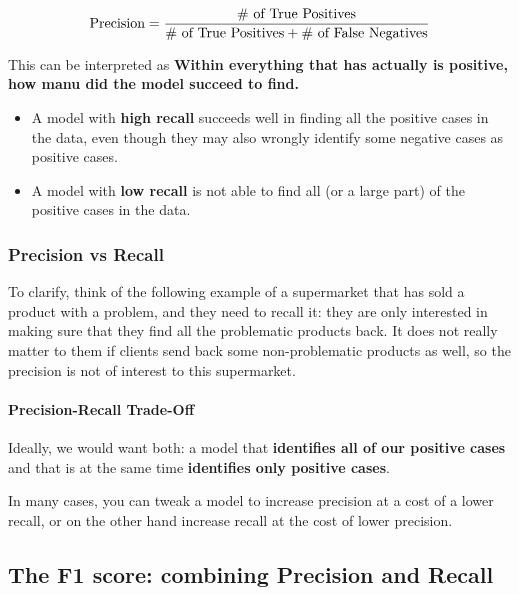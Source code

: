 \begin{align*}
\textnormal{Precision} = \frac{\# \textnormal{ of  True Positives}}{\# \textnormal{ of True Positives} + \# \textnormal{ of False Negatives}}
\end{align*}

This can be interpreted as \textbf{Within everything that has actually
is positive, how manu did the model succeed to find.}

\begin{itemize}
\item
  A model with \textbf{high recall} succeeds well in finding all the
  positive cases in the data, even though they may also wrongly identify
  some negative cases as positive cases.
\item
  A model with \textbf{low recall} is not able to find all (or a large
  part) of the positive cases in the data.
\end{itemize}

\hypertarget{precision-vs-recall}{%
\subsubsection{Precision vs Recall}\label{precision-vs-recall}}

To clarify, think of the following example of a supermarket that has
sold a product with a problem, and they need to recall it: they are only
interested in making sure that they find all the problematic products
back. It does not really matter to them if clients send back some
non-problematic products as well, so the precision is not of interest to
this supermarket.

\hypertarget{precision-recall-trade-off}{%
\paragraph{Precision-Recall
Trade-Off}\label{precision-recall-trade-off}}

Ideally, we would want both: a model that \textbf{identifies all of our
positive cases} and that is at the same time \textbf{identifies only
positive cases}.

In many cases, you can tweak a model to increase precision at a cost of
a lower recall, or on the other hand increase recall at the cost of
lower precision.

\hypertarget{the-f1-score-combining-precision-and-recall}{%
\subsection{The F1 score: combining Precision and
Recall}\label{the-f1-score-combining-precision-and-recall}}

